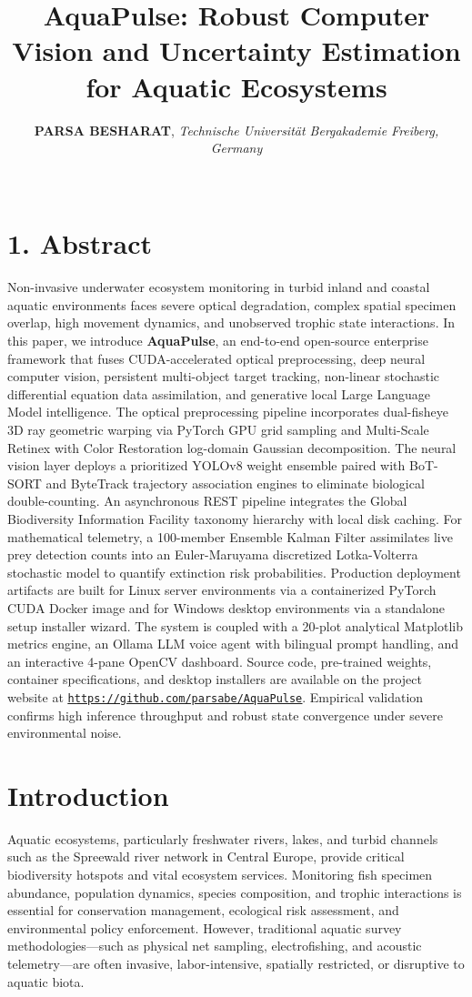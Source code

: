 \documentclass[11pt,a4paper]{article}
\title{\vspace{-0.5cm}\textbf{\huge AquaPulse: Robust Computer Vision and Uncertainty Estimation for Aquatic Ecosystems}}
\author{\textbf{\large PARSA BESHARAT}, \textit{Technische Universität Bergakademie Freiberg, Germany}\\[0.15cm]
\emailtext{parsabe99@gmail.com}\\[0.05cm]
\urltext{https://github.com/parsabe/AquaPulse}}
\date{}
\newcommand{\urltext}[1]{\href{#1}{{\color{linkblue}\underline{\texttt{#1}}}}}
\begin{document}
\maketitle

\section*{1. Abstract}
Non-invasive underwater ecosystem monitoring in turbid inland and coastal aquatic environments faces severe optical degradation, complex spatial specimen overlap, high movement dynamics, and unobserved trophic state interactions. In this paper, we introduce \textbf{AquaPulse}, an end-to-end open-source enterprise framework that fuses CUDA-accelerated optical preprocessing, deep neural computer vision, persistent multi-object target tracking, non-linear stochastic differential equation data assimilation, and generative local Large Language Model intelligence. The optical preprocessing pipeline incorporates dual-fisheye 3D ray geometric warping via PyTorch GPU grid sampling and Multi-Scale Retinex with Color Restoration log-domain Gaussian decomposition. The neural vision layer deploys a prioritized YOLOv8 weight ensemble paired with BoT-SORT and ByteTrack trajectory association engines to eliminate biological double-counting. An asynchronous REST pipeline integrates the Global Biodiversity Information Facility taxonomy hierarchy with local disk caching. For mathematical telemetry, a 100-member Ensemble Kalman Filter assimilates live prey detection counts into an Euler-Maruyama discretized Lotka-Volterra stochastic model to quantify extinction risk probabilities. Production deployment artifacts are built for Linux server environments via a containerized PyTorch CUDA Docker image and for Windows desktop environments via a standalone setup installer wizard. The system is coupled with a 20-plot analytical Matplotlib metrics engine, an Ollama LLM voice agent with bilingual prompt handling, and an interactive 4-pane OpenCV dashboard. Source code, pre-trained weights, container specifications, and desktop installers are available on the project website at \urltext{https://github.com/parsabe/AquaPulse}. Empirical validation confirms high inference throughput and robust state convergence under severe environmental noise.

\vspace{0.3cm}

\section{Introduction}
Aquatic ecosystems, particularly freshwater rivers, lakes, and turbid channels such as the Spreewald river network in Central Europe, provide critical biodiversity hotspots and vital ecosystem services. Monitoring fish specimen abundance, population dynamics, species composition, and trophic interactions is essential for conservation management, ecological risk assessment, and environmental policy enforcement. However, traditional aquatic survey methodologies—such as physical net sampling, electrofishing, and acoustic telemetry—are often invasive, labor-intensive, spatially restricted, or disruptive to aquatic biota.
\end{document}
